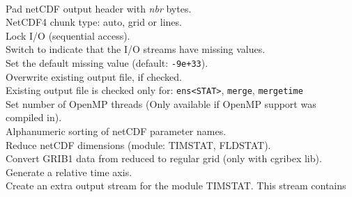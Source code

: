 \begin{tabbing}
         \> \\
\makebox[1.5in][l]{\hspace*{1cm}}
         \> Pad netCDF output header with {\it nbr} bytes. \\
         \> NetCDF4 chunk type: auto, grid or lines. \\
         \> Lock I/O (sequential access). \\
         \> Switch to indicate that the I/O streams have missing values. \\
         \> Set the default missing value (default: {\tt-9e+33}). \\
         \> Overwrite existing output file, if checked. \\
         \> Existing output file is checked only for: {\tt ens<STAT>}, {\tt merge}, {\tt mergetime} \\
         \> Set number of OpenMP threads (Only available if OpenMP support was compiled in). \\
         \> Alphanumeric sorting of netCDF parameter names. \\
         \> Reduce netCDF dimensions (module: TIMSTAT, FLDSTAT). \\
         \> Convert GRIB1 data from reduced to regular grid (only with cgribex lib). \\
         \> Generate a relative time axis. \\
         \> Create an extra output stream for the module TIMSTAT. This stream contains  \\

\end{tabbing}
